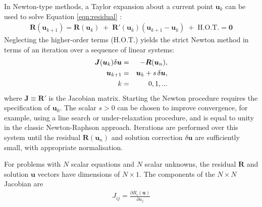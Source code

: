 \documentclass[sn-mathphys,Numbered,draft]{sn-jnl}%
\newcommand{\bb}{\boldsymbol}
\begin{document}
In Newton-type methods, a Taylor expansion about a current point $\bb{u}_k$ can be used to solve Equation \ref{eqn:residual} \cite{Knoll2004}:
\begin{eqnarray}
	\bb{R}(\bb{u}_{k+1}) = \bb{R}(\bb{u}_{k}) \;+\;  \bb{R}'(\bb{u}_{k}) (\bb{u}_{k+1} - \bb{u}_{k}) \;+\; \text{H.O.T.} = \bb{0}
\end{eqnarray}
Neglecting the higher-order terms ($\text{H.O.T.}$) yields the strict Newton method in terms of an iteration over a sequence of linear systems: 
\begin{eqnarray} \label{eq:NewtonRaphson}
	\bb{J}(\bb{u}_k) \delta \bb{u} &=& -\bb{R}(\bb{u}_n), \notag \\
	\bb{u}_{k+1} &=& \bb{u}_k + s \, \delta \bb{u}, \notag \\
	\quad
	k &=& 0,1,...
\end{eqnarray}
where $\bb{J} \equiv \bb{R}'$ is the Jacobian matrix.
Starting the Newton procedure requires the specification of $\bb{u}_0$.
The scalar $s > 0$ can be chosen to improve convergence, for example, using a line search or under-relaxation procedure, and is equal to unity in the classic Newton-Raphson approach.
Iterations are performed over this system until the residual $\bb{R}(\bb{u}_n)$ and solution correction $\delta \bb{u}$ are sufficiently small, with appropriate normalisation.


For problems with $N$ scalar equations and $N$ scalar unknowns, the residual $\bb{R}$ and solution $\bb{u}$ vectors have dimensions of $N \times 1$. %
The components of the $N \times N$ Jacobian are
\begin{eqnarray} \label{eq:J}
	{J}_{ij} = \frac{\partial {R}_i (\bb{u})}{\partial u_j}
\end{eqnarray}
\end{document}
